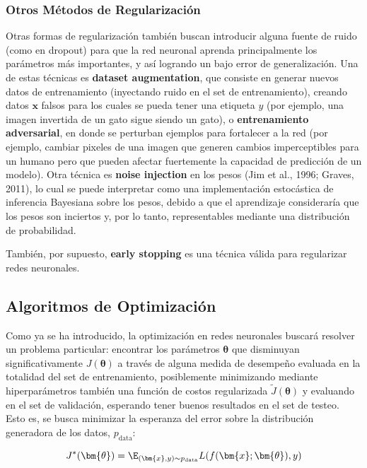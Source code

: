 \subsubsection{Otros M\'etodos de Regularizaci\'on}
Otras formas de regularizaci\'on tambi\'en buscan introducir alguna fuente de ruido (como en dropout) para que la red neuronal aprenda principalmente los par\'ametros m\'as importantes, y as\'i logrando un bajo error de generalizaci\'on. Una de estas t\'ecnicas es \textbf{dataset augmentation}, que consiste en generar nuevos datos de entrenamiento (inyectando ruido en el set de entrenamiento), creando datos $\bm{x}$ falsos para los cuales se pueda tener una etiqueta $y$ (por ejemplo, una imagen invertida de un gato sigue siendo un gato), o \textbf{entrenamiento adversarial}, en donde se perturban ejemplos para fortalecer a la red (por ejemplo, cambiar pixeles de una imagen que generen cambios imperceptibles para un humano pero que pueden afectar fuertemente la capacidad de predicci\'on de un modelo). Otra t\'ecnica es \textbf{noise injection} en los pesos (Jim et al., 1996; Graves, 2011), lo cual se puede interpretar como una implementaci\'on estoc\'astica de inferencia Bayesiana sobre los pesos, debido a que el aprendizaje considerar\'ia que los pesos son inciertos y, por lo tanto, representables mediante una distribuci\'on de probabilidad.

Tambi\'en, por supuesto, \textbf{early stopping} es una t\'ecnica v\'alida para regularizar redes neuronales.

\subsection{Algoritmos de Optimizaci\'on}

Como ya se ha introducido, la optimizaci\'on en redes neuronales buscar\'a resolver un problema particular: encontrar los par\'ametros $\bm{\theta}$ que disminuyan significativamente $J(\bm{\theta})$ a trav\'es de alguna medida de desempe{\~{n}}o evaluada en la totalidad del set de entrenamiento, posiblemente minimizando mediante hiperpar\'ametros tambi\'en una funci\'on de costos regularizada $\tilde{J}(\bm{\theta})$ y evaluando en el set de validaci\'on, esperando tener buenos resultados en el set de testeo. Esto es, se busca minimizar la esperanza del error sobre la distribuci\'on generadora de los datos, $p_{\textrm{data}}$:

\begin{equation}
J^{*}(\bm{\theta}) = \E_{(\bm{x},y)\sim {p}_{\textrm{data}}}L(f(\bm{x};\bm{\theta}),y)
\end{equation}

